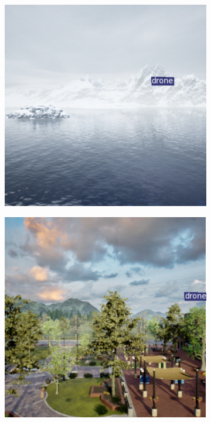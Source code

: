 \documentclass[twoside]{ctuthesis}
\theoremstyle{plain}
\theoremstyle{definition}
\theoremstyle{note}
\begin{document}
\begin{figure}[h]
	\centering
	\begin{subfigure}[b]{0.4\textwidth}
		\centering
		\includegraphics[width=\textwidth]{01640.png}
	\end{subfigure}
	\hfill
	\begin{subfigure}[b]{0.4\textwidth}
		\centering
		\includegraphics[width=\textwidth]{02002.png}

\end{subfigure}
\end{figure}
\end{document}
